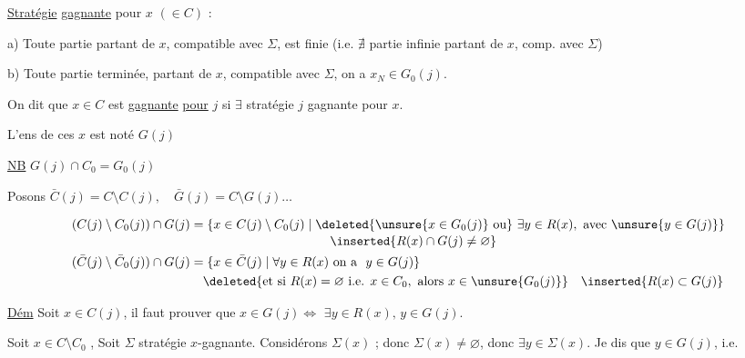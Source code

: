 \uline{Stratégie}  \uline{gagnante} pour $x$ $(\in C)$ :

a) Toute partie partant de $x$, compatible avec $\Sigma$, est finie  (i.e. $\nexists$ partie infinie partant de $x$, comp. avec $\Sigma$)

b) Toute partie terminée,  partant de $x$, compatible avec $\Sigma$, on a $x_N\in G_0(j)$.

On dit que $x\in C$ est \uline{gagnante} \uline{pour} $j$ si $\exists$ stratégie   $j$ gagnante pour $x$.

L'ens de ces $x$ est noté $G(j)$

\uline{NB} \qquad $G(j)\cap C_0=G_0(j)$

Posons $\bar C(j)=C\setminus C(j),\quad\bar G(j)=C\setminus G(j)\ldots$

 
\[
\begin{aligned}
(C(j)\setminus C_0(j))\cap G(j)&=\{x\in C(j)\setminus C_0(j)\mid \deleted{\unsure{x\in G_0(j)}\ \text{ou}}\ \exists y\in R(x),\ \text{avec }\unsure{y\in G(j)}\}\\[-2pt]
&\hspace{11em}\inserted{R(x)\cap G(j)\ne\varnothing}\\
(\bar C(j)\setminus\bar C_0(j))\cap G(j)&=\{x\in\bar C(j)\mid\forall y\in R(x)\ \text{on a }\ y\in G(j)\}\\
&\quad\deleted{\text{et si } R(x)=\varnothing\ \text{i.e. } x\in C_0,\ \text{alors }x\in\unsure{G_0(j)}}\quad\inserted{R(x)\subset G(j)}
\end{aligned}
\]

\uline{Dém} \quad {}  Soit $x\in C(j)$, il faut prouver que $x\in G(j)\Longleftrightarrow{}$  $\exists y\in R(x),\,y\in G(j)$.


Soit $x\in C\setminus C_0$ ,  Soit $\Sigma$ stratégie  $x$-gagnante. Considérons $\Sigma(x)$ ; donc  $\Sigma(x)\ne\varnothing$, donc $\exists y\in\Sigma(x)$. Je dis que $y\in G(j)$, i.e.

